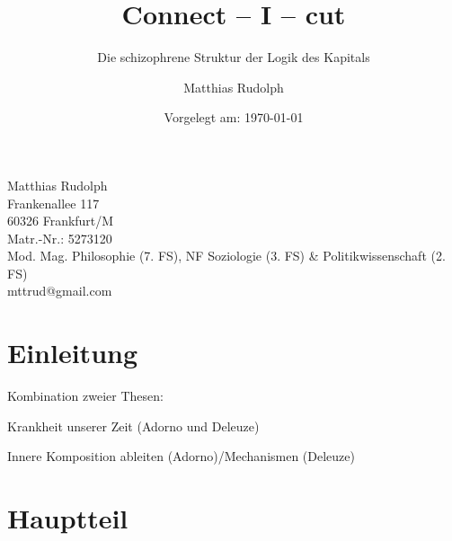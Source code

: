 \documentclass[12pt,
               DIV13,
               paper=a4,
               twoside=false,
               onehalfspacing,
               bibliography=totoc,
               toc=graduated,
               draft,
               ]{scrartcl}
\begin{document}
\setcounter{page}{0}

\titlehead{Goethe-Universität Frankfurt am Main\\
Fachbereich Philosophie und Geschichtswissenschaften\\
Institut für Philosophie\\
Prof. Dr. Christoph Menke\\
Seminar: Demokratie und Kapitalismus\\
SoSe 2013\\
Modul: VM 3b}
\title{Connect -- I -- cut}
\subtitle{Die schizophrene Struktur der Logik des Kapitals}
\author{Matthias Rudolph}
\date{Vorgelegt am: \today}

\maketitle
\vfill

\noindent Matthias Rudolph\\
Frankenallee 117\\
60326 Frankfurt/M\\
Matr.-Nr.: 5273120\\
Mod. Mag. Philosophie (7. FS), NF Soziologie (3. FS) \& Politikwissenschaft (2. FS)\\ %
mttrud@gmail.com
\newpage

\tableofcontents
\newpage


\section{Einleitung}

Kombination zweier Thesen:

Krankheit unserer Zeit (Adorno und Deleuze)

Innere Komposition ableiten (Adorno)/Mechanismen (Deleuze)


\section{Hauptteil}

\end{document}
